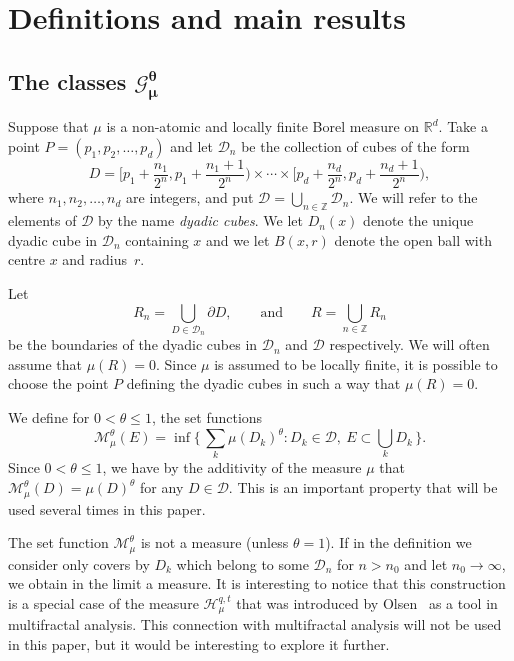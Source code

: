 \section{Definitions and main results} \label{sec:mainresults}

\subsection{The classes \texorpdfstring{$\boldsymbol{\mathscr{G}_\mu^\theta}$}{}} \label{sec:classes}

Suppose that $\mu$ is a non-atomic and locally finite Borel measure on $\mathbb{R}^d$. Take a point $P = (p_1, p_2, \ldots, p_d)$ and let $\mathscr{D}_n$ be the collection of cubes of the form
\[
D = \biggl[p_1 + \frac{n_1}{2^n}, p_1 + \frac{n_1 + 1}{2^n} \biggr)
\times \cdots \times \biggl[p_d + \frac{n_d}{2^n}, p_d + \frac{n_d + 1}{2^n} \biggr),
\]
where $n_1, n_2, \ldots, n_d$ are integers, and put $\mathscr{D} =
\bigcup_{n \in \mathbb{Z}} \mathscr{D}_n$. We will refer to the elements of $\mathscr{D}$ by the name {\em dyadic cubes}. We let $D_n (x)$ denote the unique dyadic cube in $\mathscr{D}_n$ containing $x$ and we let $B(x,r)$ denote the open ball with centre $x$ and radius~$r$.

Let
\[
R_n = \bigcup_{D \in \mathscr{D}_n} \partial D, \qquad \text{and} \qquad R = \bigcup_{n \in \mathbb{Z}} R_n
\]
be the boundaries of the dyadic cubes in $\mathscr{D}_n$ and $\mathscr{D}$ respectively. We will often assume that $\mu (R) = 0$. Since $\mu$ is assumed to be locally finite, it is possible to choose the point $P$ defining the dyadic cubes in such a way that $\mu (R) = 0$.

We define for $0 < \theta \leq 1$, the set functions
\[
\mathscr{M}_\mu^\theta (E) = \inf \biggl\{\, \sum_k \mu (D_k)^\theta : D_k \in \mathscr{D},\ E \subset \bigcup_k D_k \,\biggr\}.
\]
Since $0 < \theta \leq 1$, we have by the additivity of the measure $\mu$ that $\mathscr{M}_\mu^\theta (D) = \mu (D)^\theta$ for any $D
\in \mathscr{D}$. This is an important property that will be used several times in this paper.

The set function $\mathscr{M}_\mu^\theta$ is not a measure (unless $\theta = 1$). If in the definition we consider only covers by $D_k$ which belong to some $\mathscr{D}_n$ for $n > n_0$ and let $n_0 \to \infty$, we obtain in the limit a measure. It is interesting to notice that this construction is a special case of the measure $\mathscr{H}_\mu^{q,t}$ that was introduced by Olsen~\cite{olsen} as a tool in multifractal analysis. This connection with multifractal analysis will not be used in this paper, but it would be interesting to explore it further.

